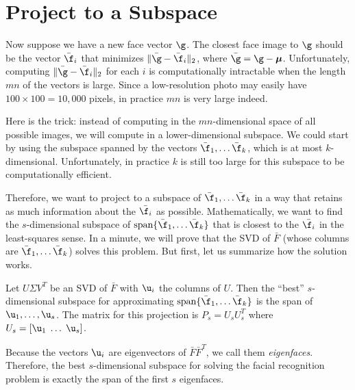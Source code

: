 \section*{Project to a Subspace}
Now suppose we have a new face vector $\g$. 
The closest face image to $\g$ should be the vector $\bar{\f}_i$ that minimizes $\|\bar{\g}-\bar{\f}_i\|_2$, where $\bar{\g} = \g - {\boldsymbol \mu}$.
Unfortunately, computing $\|\bar{\g}-\bar{\f}_i\|_2$ for each $i$ is computationally intractable when the length $mn$ of the vectors is large.
Since a low-resolution photo may easily have $100\times 100 = 10,000$ pixels, in practice $mn$ is very large indeed.

Here is the trick: instead of computing in the $mn$-dimensional space of all possible images, we will compute in a lower-dimensional subspace.
We could start by using the subspace spanned by the vectors $\bar{\f}_1, \ldots \bar{\f}_k$, which is at most $k$-dimensional. 
Unfortunately, in practice $k$ is still too large for this subspace to be computationally efficient.

Therefore, we want to project to a subspace of $\bar{\f}_1, \ldots \bar{\f}_k$ in a way that retains as much information about the $\bar{\f_i}$ as possible.
Mathematically, we want to find the $s$-dimensional subspace of $\text{span}\{\bar{\f}_1, \ldots \bar{\f}_k\}$ that is closest to the $\bar{\f_i}$ in the least-squares sense.
In a minute, we will prove that the SVD of $\bar{F}$ (whose columns are $\bar{\f}_1, \ldots \bar{\f}_k$) solves this problem.
But first, let us summarize how the solution works.

Let $U \Sigma V^T$ be an SVD of $\bar{F}$ with $\u_i$ the columns of $U$. 
Then the ``best'' $s$-dimensional subspace for approximating $\text{span}\{\bar{\f}_1, \ldots \bar{\f}_k\}$ is the span of $\u_1, \ldots, \u_s$. 
The matrix for this projection is $P_s = U_s U_s^T$ where $U_s = [ \u_1\; \ldots \; \u_s]$.

Because the vectors $\u_i$ are eigenvectors of $\bar{F}\bar{F}^T$, we call them \emph{eigenfaces}. 
Therefore, the best $s$-dimensional subspace for solving the facial recognition problem is exactly the span of the first $s$ eigenfaces.

